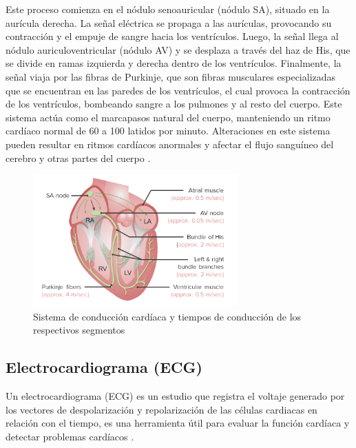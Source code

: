      Este proceso comienza en el nódulo senoauricular (nódulo SA), situado en la aurícula derecha. La señal eléctrica se propaga a las aurículas, provocando su contracción y el empuje de sangre hacia los ventrículos. Luego, la señal llega al nódulo auriculoventricular (nódulo AV) y se desplaza a través del haz de His, que se divide en ramas izquierda y derecha dentro de los ventrículos. Finalmente, la señal viaja por las fibras de Purkinje, que son fibras musculares especializadas que se encuentran en las paredes de los ventrículos, el cual provoca la contracción de los ventrículos, bombeando sangre a los pulmones y al resto del cuerpo. Este sistema actúa como el marcapasos natural del cuerpo, manteniendo un ritmo cardíaco normal de 60 a 100 latidos por minuto. Alteraciones en este sistema pueden resultar en ritmos cardíacos anormales y afectar el flujo sanguíneo del cerebro y otras partes del cuerpo \cite{SistemaConduccionMSD}.

    \begin{figure}[H]
        \centering
        \includegraphics[width=0.7\textwidth]{img/sistemaConduccion.png}
        \caption[Sistema de conducción cardíaca y tiempos de conducción de los respectivos segmentos]{Sistema de conducción cardíaca y tiempos de conducción de los respectivos segmentos\footnotemark}
        \label{fig:sistemaConduccion}
    \end{figure}

    \subsection{Electrocardiograma (ECG)}
    Un electrocardiograma (ECG) es un estudio que registra el voltaje generado por los vectores de despolarización y repolarización de las células cardiacas en relación con el tiempo, es una herramienta útil para evaluar la función cardíaca y detectar problemas cardíacos \cite{ECG_Definicion}.

